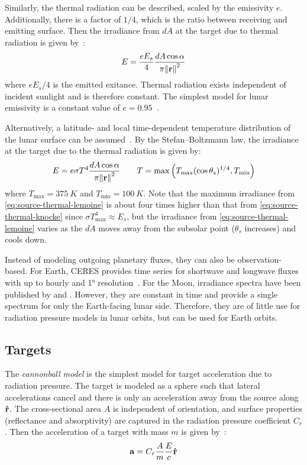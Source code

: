 \documentclass[parskip=full,DIV=15]{scrartcl}
\begin{document}
Similarly, the thermal radiation can be described, scaled by the emissivity $e$. Additionally, there is a factor of $1/4$, which is the ratio between receiving and emitting surface. Then the irradiance from $dA$ at the target due to thermal radiation is given by~\cite{Knocke1988}:
\begin{align}\label{eq:source-thermal-knocke}
   E = \frac{e E_s}{4} \frac{dA\cos\alpha}{\pi \norm{\vb r}^2}
\end{align}
where $e E_s/4$ is the emitted exitance. Thermal radiation exists independent of incident sunlight and is therefore constant. The simplest model for lunar emissivity is a constant value of $e=0.95$~\cite{Mueller2021}.

Alternatively, a latitude- and local time-dependent temperature distribution of the lunar surface can be assumed~\cite{Lemoine2013}. By the Stefan--Boltzmann law, the irradiance at the target due to the thermal radiation is given by:
\begin{align}\label{eq:source-thermal-lemoine}
   E = e\sigma T^4 \frac{dA\cos\alpha}{\pi \norm{\vb r}^2}
   \qquad
   T = \max\left(T_\text{max}(\cos\theta_s)^{1/4}, T_\text{min}\right)
\end{align}
where $T_\text{max}=\SI{375}{K}$ and $T_\text{min}=\SI{100}{K}$. Note that the maximum irradiance from \cref{eq:source-thermal-lemoine} is about four times higher than that from \cref{eq:source-thermal-knocke} since $\sigma T_\text{max}^4 \approx E_s$, but the irradiance from \cref{eq:source-thermal-lemoine} varies as the $dA$ moves away from the subsolar point ($\theta_s$ increases) and cools down.

Instead of modeling outgoing planetary fluxes, they can also be observation-based. For Earth, CERES provides time series for shortwave and longwave fluxes with up to hourly and \ang{1} resolution~\cite[]{Doelling2016}. For the Moon, irradiance spectra have been published by \textcite{Kieffer2005} and \textcite{Sun2021}. However, they are constant in time and provide a single spectrum for only the Earth-facing lunar side. Therefore, they are of little use for radiation pressure models in lunar orbits, but can be used for Earth orbits.



\subsection{Targets}
The \emph{cannonball model} is the simplest model for target acceleration due to radiation pressure. The target is modeled as a sphere such that lateral accelerations cancel and there is only an acceleration away from the source along $\vu r$. The cross-sectional area $A$ is independent of orientation, and surface properties (reflectance and absorptivity) are captured in the radiation pressure coefficient $C_r$. Then the acceleration of a target with mass $m$ is given by~\cite{Knocke1988}:
\begin{align}
   \vb a = C_r \frac{A}{m} \frac{E}{c} \vu r
\end{align}
\end{document}
